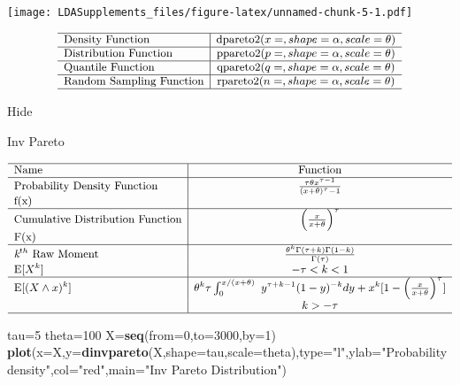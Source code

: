 \documentclass[]{book}
\newenvironment{Shaded}{\begin{snugshade}}{\end{snugshade}}
\newcommand{\KeywordTok}[1]{\textcolor[rgb]{0.13,0.29,0.53}{\textbf{#1}}}
\newcommand{\DataTypeTok}[1]{\textcolor[rgb]{0.13,0.29,0.53}{#1}}
\newcommand{\DecValTok}[1]{\textcolor[rgb]{0.00,0.00,0.81}{#1}}
\newcommand{\StringTok}[1]{\textcolor[rgb]{0.31,0.60,0.02}{#1}}
\newcommand{\NormalTok}[1]{#1}
\begin{document}
\texttt{[image: LDASupplements\_files/figure-latex/unnamed-chunk-5-1.pdf]}

\[
{\small
\begin{matrix}
\begin{array}{l|c}
\hline
  \text{Density Function} & \text{dpareto2}(x=, shape=\alpha, scale=\theta) \\
\hline
  \text{Distribution Function} & \text{ppareto2}(p=, shape=\alpha,scale=\theta) \\
\hline
  \text{Quantile Function} & \text{qpareto2}(q=, shape=\alpha,scale=\theta) \\ 
\hline
  \text{Random Sampling Function} & \text{rpareto2}(n=, shape=\alpha,scale=\theta) \\
\hline
\end{array}
\end{matrix}
}
\]

\hypertarget{2pB}{}
{Hide}

Inv Pareto

\[
{\small
\begin{matrix}
\begin{array}{l|c}
\hline
  \text{Name} & \text{Function} \\
\hline
  \text{Probability Density Function} & \frac{\tau\theta x^{\tau-1}}{(x+\theta)^\tau-1} \\
    \text{f(x)} & \\
\hline
  \text{Cumulative Distribution Function} & \Big(\frac{x}{x+\theta}\Big)^\tau \\
    \text{F(x)} & \\
\hline
  \textit{k}^{th}~\text{Raw Moment} & \frac{\theta^k\Gamma(\tau+k)\Gamma(1-k)}{\Gamma(\tau)} \\
  \mathrm{E}[X^k]  & -\tau<k<1 \\
\hline
  \mathrm{E}[(X\wedge x)^k] & \theta^k\tau\int^{x/(x+\theta)}_0~y^{\tau+k-1}(1-y)^{-k}dy+x^k[1-\Big(\frac{x}{x+\theta}\Big)^\tau] \\
  & k>-\tau \\
\hline
\end{array}
\end{matrix}
}
\]

\begin{Shaded}
\begin{Highlighting}[]
\NormalTok{tau=}\DecValTok{5}
\NormalTok{theta=}\DecValTok{100}
\NormalTok{X=}\KeywordTok{seq}\NormalTok{(}\DataTypeTok{from=}\DecValTok{0}\NormalTok{,}\DataTypeTok{to=}\DecValTok{3000}\NormalTok{,}\DataTypeTok{by=}\DecValTok{1}\NormalTok{)}
\KeywordTok{plot}\NormalTok{(}\DataTypeTok{x=}\NormalTok{X,}\DataTypeTok{y=}\KeywordTok{dinvpareto}\NormalTok{(X,}\DataTypeTok{shape=}\NormalTok{tau,}\DataTypeTok{scale=}\NormalTok{theta),}\DataTypeTok{type=}\StringTok{"l"}\NormalTok{,}\DataTypeTok{ylab=}\StringTok{"Probability density"}\NormalTok{,}\DataTypeTok{col=}\StringTok{"red"}\NormalTok{,}\DataTypeTok{main=}\StringTok{"Inv Pareto Distribution"}\NormalTok{)}
\end{Highlighting}
\end{Shaded}
\end{document}
